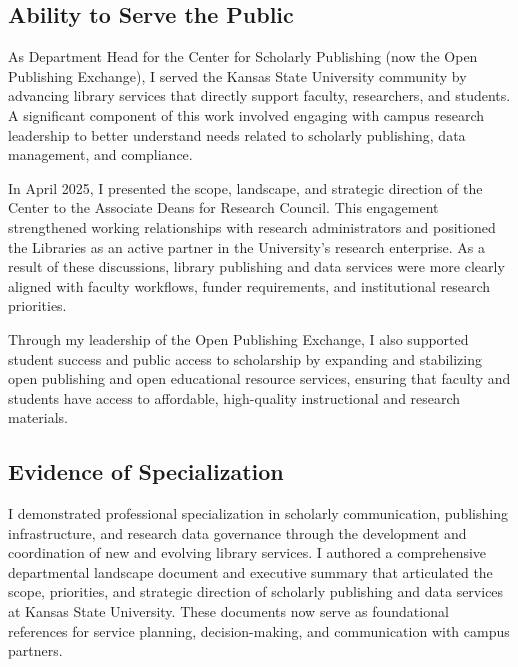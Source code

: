 \ExampleNote

\subsection*{Ability to Serve the Public}

As Department Head for the Center for Scholarly Publishing (now the Open Publishing Exchange), I served the Kansas State University community by advancing library services that directly support faculty, researchers, and students. A significant component of this work involved engaging with campus research leadership to better understand needs related to scholarly publishing, data management, and compliance.

In April 2025, I presented the scope, landscape, and strategic direction of the Center to the Associate Deans for Research Council. This engagement strengthened working relationships with research administrators and positioned the Libraries as an active partner in the University’s research enterprise. As a result of these discussions, library publishing and data services were more clearly aligned with faculty workflows, funder requirements, and institutional research priorities.

Through my leadership of the Open Publishing Exchange, I also supported student success and public access to scholarship by expanding and stabilizing open publishing and open educational resource services, ensuring that faculty and students have access to affordable, high-quality instructional and research materials.

\subsection*{Evidence of Specialization}

I demonstrated professional specialization in scholarly communication, publishing infrastructure, and research data governance through the development and coordination of new and evolving library services. I authored a comprehensive departmental landscape document and executive summary that articulated the scope, priorities, and strategic direction of scholarly publishing and data services at Kansas State University. These documents now serve as foundational references for service planning, decision-making, and communication with campus partners.

